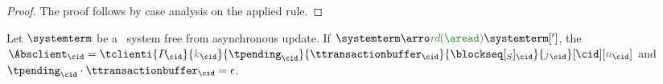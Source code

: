 \begin{proof}The proof follows by case analysis on the applied rule.
\end{proof}

\begin{corollary}\label{corollary:async-emptyqueue} Let $\systemterm$  be a \gsp\ system free from asynchronous update. If $\systemterm\arroi{\readtran{\aread}}\systemterm[']$,
the $\Absclient_{\cid}= \tclienti{\tprogram_{\cid}}{\tknown_{\cid}}{\tpending_{\cid}}{\ttransactionbuffer_{\cid}}{\tsent_{\cid}}{\treceivebuffer_{\cid}}[\cid][\trounds_{\cid}]$ and
$\tpending_{\cid}\cdot{\ttransactionbuffer_{\cid}} = \epsilon$.
\end{corollary}



%
%
%
%
%
%
%
%
%
